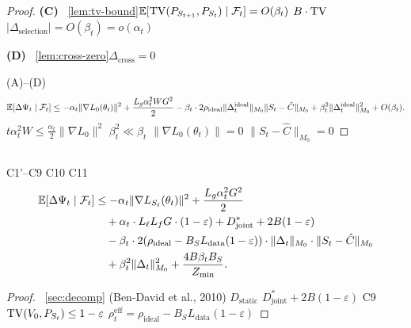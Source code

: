 \begin{proof}
\textbf{(C) } ~\ref{lem:tv-bound}$\mathbb{E}[\operatorname{TV}(P_{S_{t+1}}, P_{S_t}) \mid \mathcal{F}_t] = O(\beta_t)$ $B \cdot \operatorname{TV}$  $|\Delta_{\text{selection}}| = O(\beta_t) = o(\alpha_t)$

\textbf{(D) } ~\ref{lem:cross-zero}$\Delta_{\text{cross}} = 0$

\textbf{}  (A)--(D)
\begin{equation}
    \mathbb{E}[\Delta\Psi_t \mid \mathcal{F}_t] \leq -\alpha_t \|\nabla L_0(\theta_t)\|^2 + \frac{L_g \alpha_t^2 W G^2}{2} - \beta_t \cdot 2\rho_{\text{ideal}} \|\Delta_t^{\text{ideal}}\|_{M_0} \|S_t - \hat{C}\|_{M_0} + \beta_t^2 \|\Delta_t^{\text{ideal}}\|_{M_0}^2 + O(\beta_t).
\end{equation}
 $t$$\alpha_t^2 W \leq \frac{\alpha_t}{2}\|\nabla L_0\|^2$  $\beta_t^2 \ll \beta_t$ $\|\nabla L_0(\theta_t)\| = 0$  $\|S_t - \hat{C}\|_{M_0} = 0$
\end{proof}

\subsection{}\label{sec:tightest}



\begin{lemma}[ Lyapunov ]\label{lem:tightest}
 C1'--C9  C10  C11 
\begin{align}
    \mathbb{E}[\Delta\Psi_t \mid \mathcal{F}_t] &\leq -\alpha_t \|\nabla L_{S_t}(\theta_t)\|^2 + \frac{L_g \alpha_t^2 G^2}{2} \notag\\
    &\quad + \alpha_t \cdot L_\ell L_f G \cdot (1 - \varepsilon) + D_{\text{joint}}^* + 2B(1-\varepsilon) \notag\\
    &\quad - \beta_t \cdot 2(\rho_{\text{ideal}} - B_S L_{\text{data}}(1-\varepsilon)) \cdot \|\Delta_t\|_{M_0} \cdot \|S_t - \hat{C}\|_{M_0} \notag\\
    &\quad + \beta_t^2 \|\Delta_t\|_{M_0}^2 + \frac{4B \beta_t B_S}{Z_{\min}}.
\end{align}
\end{lemma}

\begin{proof}
~\ref{sec:decomp}  (Ben-David et al., 2010)  $D_{\text{static}}$  $D_{\text{joint}}^* + 2B(1-\varepsilon)$  C9  $\operatorname{TV}(V_0, P_{S_t}) \leq 1 - \varepsilon$ $\rho_t^{\text{eff}} = \rho_{\text{ideal}} - B_S L_{\text{data}}(1-\varepsilon)$\textbf{}
\end{proof}

